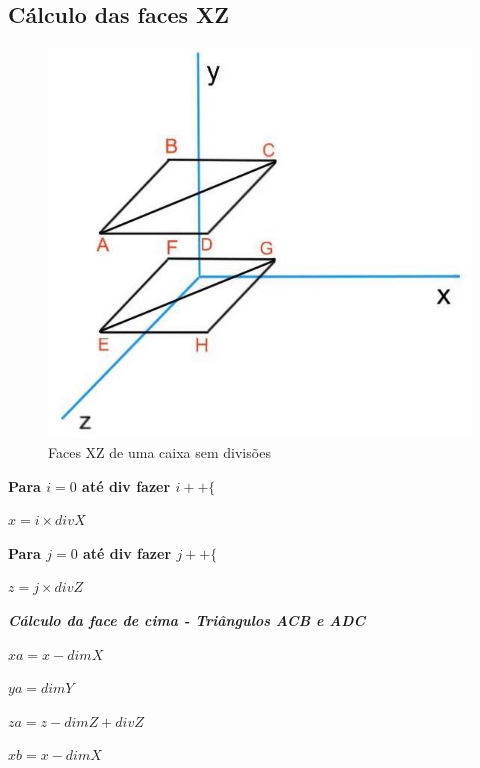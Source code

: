 \documentclass[12pt]{article}
\begin{document}
\subsection{Cálculo das faces XZ}
\begin{figure}[H]
\centering\includegraphics[scale=0.45]{XZ} 
\caption{\label{fig:controller}Faces XZ de uma caixa sem divisões}
\end{figure}
\textbf{Para $ i = 0$ até div fazer $i++\{$} \newline
\par $x = i\times divX$\newline
\par \textbf{Para $ j = 0$ até div fazer $j++\{$} \newline
\par $z = j\times divZ$\newline
\par\textit{\textbf{Cálculo da face de cima - Triângulos ACB e ADC}} \newline
\par$xa = x - dimX$ \newline
\par$ya = dimY$ \newline
\par$za = z-dimZ+divZ$ \newline\newline
\par$xb = x - dimX$ \newline
\end{document}
